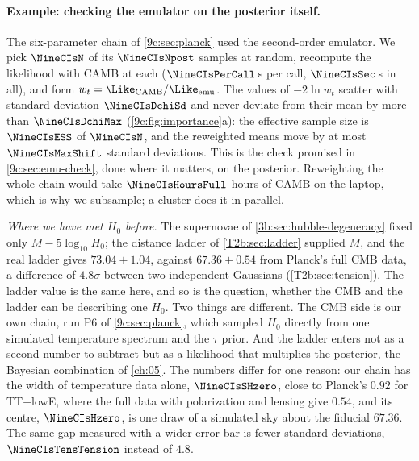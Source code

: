 \paragraph{Example: checking the emulator on the posterior itself.} The six-parameter chain of \cref{9c:sec:planck} used
the second-order emulator. We pick $\NineCIsN$ of its $\NineCIsNpost$ samples at random, recompute the likelihood with CAMB
at each ($\NineCIsPerCall$\,s per call, $\NineCIsSec$\,s in all), and form $w_t=\Like_{\rm CAMB}/\Like_{\rm emu}$. The values of
$-2\ln w_t$ scatter with standard deviation $\NineCIsDchiSd$ and never deviate from their mean by more than $\NineCIsDchiMax$
(\cref{9c:fig:importance}a): the effective sample size is $\NineCIsESS$ of $\NineCIsN$, and the reweighted means move by
at most $\NineCIsMaxShift$ standard deviations. This is the check promised in \cref{9c:sec:emu-check}, done where it matters,
on the posterior. Reweighting the whole chain would take $\NineCIsHoursFull$ hours of CAMB on the laptop, which is why we
subsample; a cluster does it in parallel.

\emph{Where we have met $H_0$ before.} The supernovae of \cref{3b:sec:hubble-degeneracy} fixed only $M-5\log_{10}H_0$; the distance ladder of \cref{T2b:sec:ladder} supplied $M$, and the real ladder gives $73.04\pm1.04$, against $67.36\pm0.54$ from Planck's full CMB data, a difference of $4.8\sigma$ between two independent Gaussians (\cref{T2b:sec:tension}). The ladder value is the same here, and so is the question, whether the CMB and the ladder can be describing one $H_0$. Two things are different. The CMB side is our own chain, run P6 of \cref{9c:sec:planck}, which sampled $H_0$ directly from one simulated temperature spectrum and the $\tau$ prior. And the ladder enters not as a second number to subtract but as a likelihood that multiplies the posterior, the Bayesian combination of \cref{ch:05}. The numbers differ for one reason: our chain has the width of temperature data alone, $\NineCIsSHzero$, close to Planck's $0.92$ for TT+lowE, where the full data with polarization and lensing give $0.54$, and its centre, $\NineCIsHzero$, is one draw of a simulated sky about the fiducial $67.36$. The same gap measured with a wider error bar is fewer standard deviations, $\NineCIsTensTension$ instead of $4.8$.


